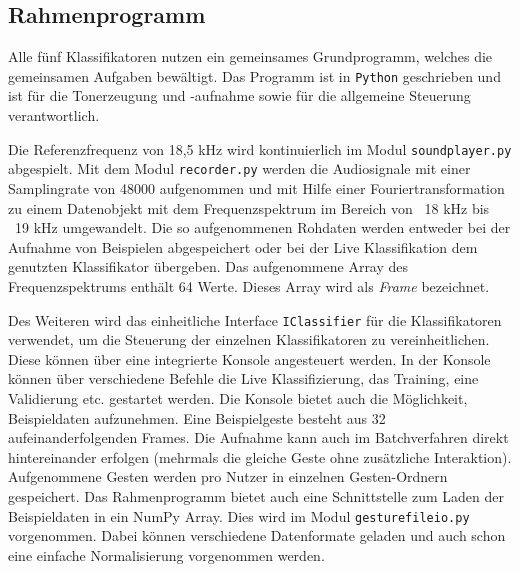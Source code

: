 \subsection{Rahmenprogramm}
\label{sec:app}
Alle fünf Klassifikatoren nutzen ein gemeinsames Grundprogramm, welches die
gemeinsamen Aufgaben bewältigt. Das Programm ist in \texttt{Python} geschrieben
und ist für die Tonerzeugung und -aufnahme sowie für die allgemeine Steuerung
verantwortlich. 

Die Referenzfrequenz von 18,5 kHz wird kontinuierlich im Modul
\texttt{soundplayer.py} abgespielt. Mit dem Modul \texttt{recorder.py} werden
die Audiosignale mit einer Samplingrate von 48000 aufgenommen und mit Hilfe einer
Fouriertransformation zu einem Datenobjekt mit dem Frequenzspektrum im Bereich
von ~18 kHz bis ~19 kHz umgewandelt. Die so aufgenommenen Rohdaten werden
entweder bei der Aufnahme von Beispielen abgespeichert oder bei der Live
Klassifikation dem genutzten Klassifikator übergeben. Das aufgenommene Array des
Frequenzspektrums enthält 64 Werte. Dieses Array wird als \textit{Frame}
bezeichnet.

Des Weiteren wird das einheitliche Interface \texttt{IClassifier} für die
Klassifikatoren verwendet, um die Steuerung der einzelnen Klassifikatoren zu
vereinheitlichen. Diese können über eine integrierte Konsole angesteuert werden.
In der Konsole können über verschiedene Befehle die Live Klassifizierung, das
Training, eine Validierung etc. gestartet werden.
\enlargethispage{\baselineskip}
Die Konsole bietet auch die Möglichkeit, Beispieldaten aufzunehmen. Eine
Beispielgeste besteht aus 32 aufeinanderfolgenden Frames. Die Aufnahme kann auch
im Batchverfahren direkt hintereinander erfolgen (mehrmals die gleiche Geste
ohne zusätzliche Interaktion). Aufgenommene Gesten werden pro Nutzer in
einzelnen Gesten-Ordnern gespeichert. Das Rahmenprogramm bietet auch eine
Schnittstelle zum Laden der Beispieldaten in ein NumPy Array. Dies wird im Modul
\texttt{gesturefileio.py} vorgenommen. Dabei können verschiedene Datenformate
geladen und auch schon eine einfache Normalisierung vorgenommen werden.


